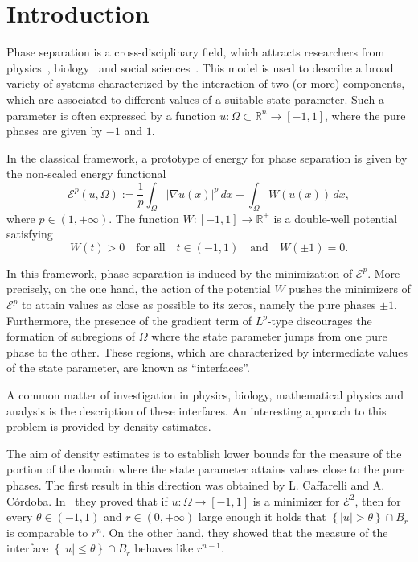 \documentclass[12pt]{article}
\newcommand{\R}{\mathbb{R}}
\numberwithin{equation}{section}
\renewcommand{\leq}{\leqslant}
\begin{document}
\section{Introduction}
Phase separation is a cross-disciplinary field, which attracts researchers from  physics~\cite{weber2019physics,ter2013collected,MR0523642,gurtin1985theory, ginzburg1958theory,cahn1958free,allen1972ground,MR1002633}, biology~\cite{brangwynne2009germline,alberti2017phase,mitrea2016phase} and social sciences~\cite{harding2020population,castellano2009statistical}. This model is used to describe a broad variety of systems characterized by the interaction of two (or more) components, which are associated to different values of a suitable state parameter. Such a parameter is often expressed by a function $u:\Omega\subset\R^n \to [-1,1]$, where the pure phases are given by $-1$ and $1$.  

In the classical framework, a prototype of energy for phase separation is given by the  non-scaled energy functional
\begin{equation}\label{NSGL}
\mathcal{E}^p(u,\Omega):= \frac{1}{p}\int_{\Omega}\left|\nabla u(x)\right|^p\,dx+\int_{\Omega} W(u(x))\,dx, 
\end{equation}
where $p\in (1,+\infty)$. The function $W:[-1,1]\to \R^+$ is a double-well potential satisfying
\begin{equation*}
W(t)>0\quad\mbox{for all}\quad t\in (-1,1)\quad\mbox{and}\quad W(\pm 1)=0. 
\end{equation*}

In this framework, phase separation is induced by the minimization of $\mathcal{E}^p$. More precisely,
on the one hand, the action of the potential $W$ pushes the minimizers of $\mathcal{E}^p$ to attain values as close as possible to its zeros, namely the pure phases $\pm 1$. Furthermore, the presence of the gradient term of $L^p$-type discourages the formation of subregions of $\Omega$ where the state parameter jumps from one pure phase to the other. These regions, which are characterized by intermediate values of the state parameter, are known as ``interfaces''. 

A common matter of investigation in physics, biology, mathematical physics and analysis is the description of these interfaces. An interesting approach to this problem is provided by density estimates.    

The aim of density estimates is to establish lower bounds for the measure of the portion of the domain where the state parameter attains values close to the pure phases. The first result in this direction was obtained by L. Caffarelli and A. C\'ordoba. In~\cite{MR1310848} they proved that if $u:\Omega\to [-1,1]$ is a minimizer for $\mathcal{E}^2$, then for every $\theta\in (-1,1)$ and $r\in (0,+\infty)$ large enough it holds that $\left\lbrace \left|u\right|>\theta \right\rbrace\cap B_r$ is comparable to $r^n$. On the other hand, they showed that the
measure of the interface $\left\lbrace \left|u\right|\leq \theta\right\rbrace\cap B_r$ behaves like $r^{n-1}$.
\end{document}
